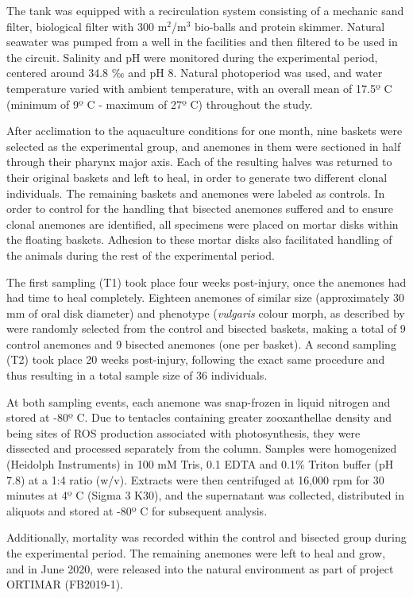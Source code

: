 \documentclass[final,3p,times,authoryear]{elsarticle}
\begin{document}
The tank was equipped with a recirculation system consisting of a mechanic sand filter, biological filter with 300 m$^2$/m$^3$ bio-balls and protein skimmer. Natural seawater was pumped from a well in the facilities and then filtered to be used in the circuit. Salinity and pH were monitored during the experimental period, centered around 34.8 ‰ and pH 8. Natural photoperiod was used, and water temperature varied with ambient temperature, with an overall mean of 17.5º C (minimum of 9º C - maximum of 27º C) throughout the study.

After acclimation to the aquaculture conditions for one month, nine baskets were selected as the experimental group, and anemones in them were sectioned in half through their pharynx major axis. Each of the resulting halves was returned to their original baskets and left to heal, in order to generate two different clonal individuals. The remaining baskets and anemones were labeled as controls. In order to control for the handling that bisected anemones suffered and to ensure clonal anemones are identified, all specimens were placed on mortar disks within the floating baskets. Adhesion to these mortar disks also facilitated handling of the animals during the rest of the experimental period.

The first sampling (T1) took place four weeks post-injury, once the anemones had had time to heal completely. Eighteen anemones of similar size (approximately 30 mm of oral disk diameter) and phenotype (\textit{vulgaris} colour morph, as described by \citet{Porro2019} were randomly selected from the control and bisected baskets, making a total of 9 control anemones and 9 bisected anemones (one per basket). A second sampling (T2) took place 20 weeks post-injury, following the exact same procedure and thus resulting in a total sample size of 36 individuals. 

At both sampling events, each anemone was snap-frozen in liquid nitrogen and stored at -80º C. Due to tentacles containing greater zooxanthellae density and being sites of ROS production associated with photosynthesis, they were dissected and processed separately from the column. Samples were homogenized (Heidolph Instruments) in 100 mM Tris, 0.1 EDTA and 0.1\% Triton buffer (pH 7.8) at a 1:4 ratio (w/v). Extracts were then centrifuged at 16,000 rpm for 30 minutes at 4º C (Sigma 3 K30), and the supernatant was collected, distributed in aliquots and stored at -80º C for subsequent analysis. 

Additionally, mortality was recorded within the control and bisected group during the experimental period. The remaining anemones were left to heal and grow, and in June 2020, were released into the natural environment as part of project ORTIMAR (FB2019-1). 
\end{document}
